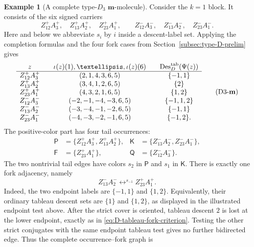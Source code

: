\documentclass[11pt]{article}
\theoremstyle{definition}
\newtheorem{example}[theorem]{Example}
\theoremstyle{remark}
\newcommand{\Des}{\operatorname{Des}}
\newcommand{\mgraph}{\mathbf m}
\begin{document}
\begin{example}[A complete type-$D_3$ $\mgraph$-molecule]
\label{ex:D3-m-molecule}
Consider the $k=1$ block.  It consists of the six signed carriers
\[
 Z_{12}^+A_3^+,\quad Z_{13}^+A_2^+,\quad Z_{23}^+A_1^+,\qquad
 Z_{12}^-A_3^-,\quad Z_{13}^-A_2^-,\quad Z_{23}^-A_1^-.
\]
Here and below we abbreviate $s_i$ by $i$ inside a descent-label set.
Applying the completion formulas and the four fork cases from
Section~\ref{subsec:type-D-prelim} gives
\[
\begin{array}{c@{\qquad}c@{\qquad}c}
z&\iota(z)(1),\ldots,\iota(z)(6)
  &\Des_D^{\mathrm{tab}}(\Psi(z))\\ \hline
Z_{12}^+A_3^+&(2,1,4,3,6,5)&\{-1,1\}\\
Z_{13}^+A_2^+&(3,4,1,2,6,5)&\{2\}\\
Z_{23}^+A_1^+&(4,3,2,1,6,5)&\{1,2\}\\
Z_{12}^-A_3^-&(-2,-1,-4,-3,6,5)&\{-1,1,2\}\\
Z_{13}^-A_2^-&(-3,-4,-1,-2,6,5)&\{-1,1\}\\
Z_{23}^-A_1^-&(-4,-3,-2,-1,6,5)&\{-1,2\}.
\end{array}
\tag{D3-$\mgraph$}
\]
The positive-color part has four tail occurrences:
\begin{align*}
 \mathsf P&=\{Z_{12}^+A_3^+,Z_{13}^+A_2^+\},
 &\mathsf K&=\{Z_{13}^-A_2^-,Z_{23}^-A_1^-\},\\
 \mathsf F&=\{Z_{23}^+A_1^+\},
 &\mathsf Q&=\{Z_{12}^-A_3^-\}.
\end{align*}
The two nontrivial tail edges have colors $s_2$ in $\mathsf P$ and
$s_1$ in $\mathsf K$.  There is exactly one fork adjacency, namely
\[
 Z_{13}^-A_2^-
       \mathrel{\mathop{\longleftrightarrow}^{s_{-1}}}
 Z_{23}^+A_1^+.
\]
Indeed, the two endpoint labels are $\{-1,1\}$ and $\{1,2\}$.
Equivalently, their ordinary tableau descent sets are $\{1\}$ and
$\{1,2\}$, as displayed in the illustrated endpoint test above.  After
the strict cover is oriented, tableau descent $2$ is lost at the lower
endpoint, exactly as in \eqref{eq:D-tableau-fork-criterion}.  Testing the
other strict conjugates with the same endpoint tableau test gives no
further bidirected edge.  Thus the complete occurrence--fork graph is
\begin{center}


\end{center}
\end{example}
\end{document}
